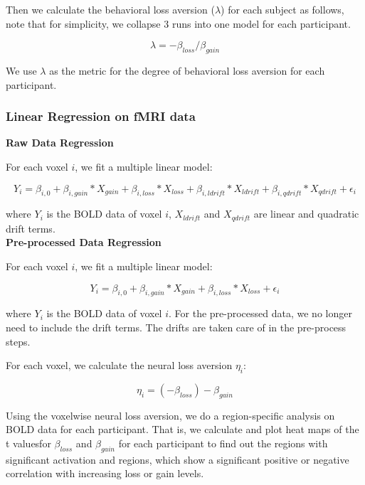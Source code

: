 \documentclass[11pt]{article}
\begin{document}
Then we calculate the behavioral loss aversion ($ \lambda $) for each subject 
as follows, note that for simplicity, we collapse 3 runs into one model for 
each participant.

\begin{equation}
\lambda = -\beta_{loss} / \beta_{gain}
\end{equation}

We use $\lambda$ as the metric for the degree of behavioral loss aversion for 
each participant. 

\subsubsection{Linear Regression on fMRI data}

\textbf{Raw Data Regression}

For each voxel $i$, we fit a multiple linear model:

\begin{equation}
Y_{i} = \beta_{i, 0} + \beta_{i, gain} * X_{gain}  + \beta_{i, loss} *X_{loss} 
+ \beta_{i,ldrift} *X_{ldrift} + \beta_{i, qdrift} * X_{qdrift} 
+ \epsilon_i
\end{equation}

where $Y_{i}$ is the BOLD data of voxel $i$,  $X_{ldrift}$ and $X_{qdrift}$ are 
linear and quadratic drift terms. \\

\textbf{Pre-processed Data Regression}

For each voxel $i$, we fit a multiple linear model:

\begin{equation}
Y_{i} = \beta_{i, 0} + \beta_{i, gain} * X_{gain}  +  \beta_{i, loss} *X_{loss} 
+ \epsilon_i
\end{equation}

where $Y_{i}$ is the BOLD data of voxel $i$.
For the pre-processed data, we no longer need to include the drift terms. The 
drifts are taken care of in the pre-process steps.

For each voxel, we calculate the 
neural loss aversion $\eta_i$:

\begin{equation}
\eta_i = (-\beta_{loss}) - \beta_{gain}
\end{equation}

Using the voxelwise neural loss aversion, we do a region-specific analysis on 
BOLD data for each participant. That is, we calculate and plot heat maps of the 
t valuesfor $\beta_{loss}$ and $\beta_{gain}$ for each participant to find out 
the regions with significant activation and regions, which show a significant 
positive or negative correlation with increasing loss or gain levels.
\end{document}

